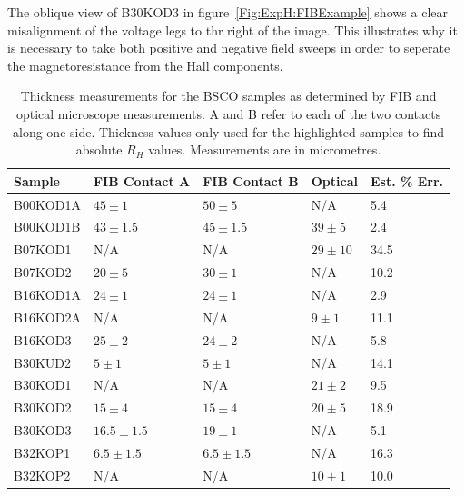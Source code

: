 The oblique view of B30KOD3 in figure~\ref{Fig:ExpH:FIBExample} shows a clear misalignment of the voltage legs to thr right of the image. This illustrates why it is necessary to take both positive and negative field sweeps in order to seperate the magnetoresistance from the Hall components.


\begin{table}
    \begin{center}
           \caption{Thickness measurements for the \ac{BSCO} samples as determined by \ac{FIB} and optical microscope measurements. A and B refer to each of the two contacts along one side. Thickness values only used for the highlighted samples to find absolute $R_H$ values. Measurements are in micrometres.}
        \begin{tabular}[htbp]{lllll}
\toprule
Sample  & \ac{FIB} Contact A    & \ac{FIB} Contact B    & Optical	& Est. \% Err.	\\
\midrule
\cellcolor[gray]{0.9}B00KOD1A	& \cellcolor[gray]{0.9}$45\pm1$	& \cellcolor[gray]{0.9}$50\pm5$	& \cellcolor[gray]{0.9}N/A		& \cellcolor[gray]{0.9}5.4	\\
B00KOD1B	& $43\pm1.5$	& $45\pm1.5$	& $39\pm5$ 	& 2.4	\\
B07KOD1		& N/A		& N/A		& $29\pm10$	& 34.5	\\
\cellcolor[gray]{0.9}B07KOD2	& \cellcolor[gray]{0.9}$20\pm5$ 	& \cellcolor[gray]{0.9}$30\pm1$ 	& \cellcolor[gray]{0.9}N/A		& \cellcolor[gray]{0.9}10.2	\\
\cellcolor[gray]{0.9}B16KOD1A	& \cellcolor[gray]{0.9}$24\pm1$ 	& \cellcolor[gray]{0.9}$24\pm1$ 	& \cellcolor[gray]{0.9}N/A		& \cellcolor[gray]{0.9}2.9	\\
B16KOD2A	& N/A		& N/A		& $9\pm1$ 	& 11.1	\\
B16KOD3 	& $25\pm2$ 	& $24\pm2$ 	& N/A		& 5.8	\\
B30KUD2 	& $5 \pm1$ 	& $5 \pm1$ 	& N/A		& 14.1	\\
B30KOD1 	& N/A		& N/A		& $21\pm2$ 	& 9.5	\\
B30KOD2 	& $15\pm4$	& $15\pm4$	& $20\pm5$ 	& 18.9	\\
\cellcolor[gray]{0.9}B30KOD3 	& \cellcolor[gray]{0.9}$16.5\pm1.5$	& \cellcolor[gray]{0.9}$19\pm1$	& \cellcolor[gray]{0.9}N/A		& \cellcolor[gray]{0.9}5.1	\\
\cellcolor[gray]{0.9}B32KOP1 	& \cellcolor[gray]{0.9}$6.5\pm1.5$	& \cellcolor[gray]{0.9}$6.5\pm1.5$	& \cellcolor[gray]{0.9}N/A	& \cellcolor[gray]{0.9}16.3	\\
B32KOP2 	& N/A		& N/A		& $10\pm1$ 	& 10.0	\\

\end{tabular}
\end{center}
\end{table}
